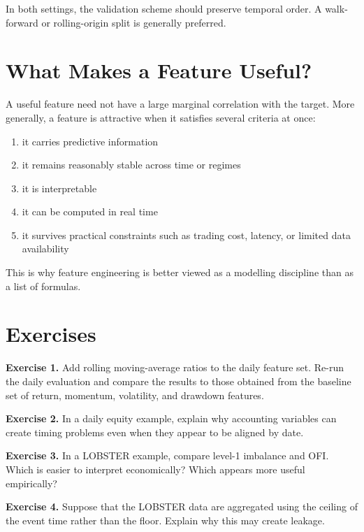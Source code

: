 \documentclass[11pt]{article}
\newcommand{\answerlines}[1]{\vspace{#1\baselineskip}}
\begin{document}
In both settings, the validation scheme should preserve temporal order. A
walk-forward or rolling-origin split is generally preferred.

\newpage

\section*{What Makes a Feature Useful?}

A useful feature need not have a large marginal correlation with the target.
More generally, a feature is attractive when it satisfies several criteria at
once:

\begin{enumerate}
  \item it carries predictive information
  \item it remains reasonably stable across time or regimes
  \item it is interpretable
  \item it can be computed in real time
  \item it survives practical constraints such as trading cost, latency, or limited data availability
\end{enumerate}

This is why feature engineering is better viewed as a modelling discipline than
as a list of formulas.

\section*{Exercises}

\textbf{Exercise 1.} Add rolling moving-average ratios to the daily feature set.
Re-run the daily evaluation and compare the results to those obtained from the
baseline set of return, momentum, volatility, and drawdown features.

\answerlines{6}

\textbf{Exercise 2.} In a daily equity example, explain why accounting
variables can create timing problems even when they appear to be aligned by
date.

\answerlines{6}

\textbf{Exercise 3.} In a LOBSTER example, compare level-1 imbalance and OFI.
Which is easier to interpret economically? Which appears more useful empirically?

\answerlines{6}

\textbf{Exercise 4.} Suppose that the LOBSTER data are aggregated using the
ceiling of the event time rather than the floor. Explain why this may create
leakage.
\end{document}
